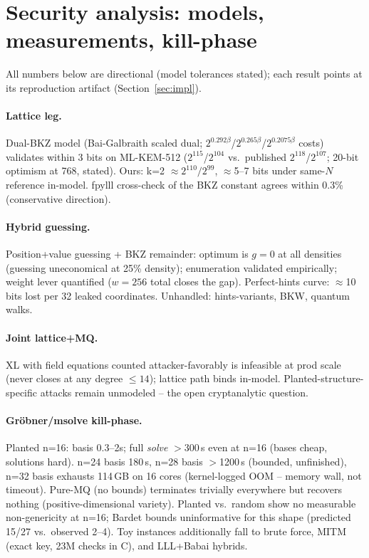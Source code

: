 \section{Security analysis: models, measurements, kill-phase}
\label{sec:analysis}

All numbers below are directional (model tolerances stated); each result
points at its reproduction artifact (Section~\ref{sec:impl}).

\paragraph{Lattice leg.} Dual-BKZ model (Bai-Galbraith scaled dual;
$2^{0.292\beta}$/$2^{0.265\beta}$/$2^{0.2075\beta}$ costs) validates within
3 bits on ML-KEM-512 ($2^{115}$/$2^{104}$ vs.\ published $2^{118}$/$2^{107}$;
20-bit optimism at 768, stated). Ours: k=2 $\approx 2^{110}/2^{99}$,
$\approx$5--7 bits under same-$N$ reference in-model. fpylll cross-check of
the BKZ constant agrees within 0.3\% (conservative direction).

\paragraph{Hybrid guessing.} Position+value guessing + BKZ remainder:
optimum is $g{=}0$ at all densities (guessing uneconomical at 25\%
density); enumeration validated empirically; weight lever quantified
($w{=}256$ total closes the gap). Perfect-hints curve: $\approx$10 bits
lost per 32 leaked coordinates. Unhandled: hints-variants, BKW,
quantum walks.

\paragraph{Joint lattice+MQ.} XL with field equations counted
attacker-favorably is infeasible at prod scale (never closes at any degree
$\le 14$); lattice path binds in-model. Planted-structure-specific attacks
remain unmodeled -- the open cryptanalytic question.

\paragraph{Gr\"obner/msolve kill-phase.} Planted n=16: basis 0.3--2s;
full \emph{solve} $>$300\,s even at n=16 (bases cheap, solutions hard).
n=24 basis 180\,s, n=28 basis $>$1200\,s (bounded, unfinished), n=32 basis
exhausts 114\,GB on 16 cores (kernel-logged OOM -- memory wall, not timeout). Pure-MQ
(no bounds) terminates trivially everywhere but recovers nothing
(positive-dimensional variety). Planted vs.\ random show no measurable
non-genericity at n=16; Bardet bounds uninformative for this shape
(predicted 15/27 vs.\ observed 2--4). Toy instances additionally fall to
brute force, MITM (exact key, 23M checks in C), and LLL+Babai hybrids.


